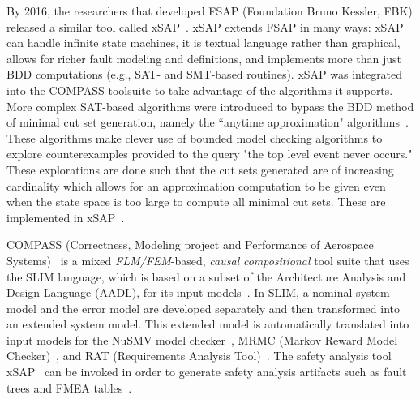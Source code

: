 By 2016, the researchers that developed FSAP (Foundation Bruno Kessler, FBK) released a similar tool called xSAP~\cite{DBLP:conf/tacas/BittnerBCCGGMMZ16}. xSAP extends FSAP in many ways: xSAP can handle infinite state machines, it is textual language rather than graphical, allows for richer fault modeling and definitions, and implements more than just BDD computations (e.g., SAT- and SMT-based routines). xSAP was integrated into the COMPASS toolsuite to take advantage of the algorithms it supports. More complex SAT-based algorithms were introduced to bypass the BDD method of minimal cut set generation, namely the ``anytime approximation" algorithms~\cite{CAV2015:BoCiGrMa, mattarei2016scalable}. These algorithms make clever use of bounded model checking algorithms to explore counterexamples provided to the query "the top level event never occurs." These explorations are done such that the cut sets generated are of increasing cardinality which allows for an approximation computation to be given even when the state space is too large to compute all minimal cut sets. These are implemented in xSAP~\cite{CAV2015:BoCiGrMa}.

COMPASS (Correctness, Modeling project and Performance of Aerospace Systems)~\cite{10.1007/978-3-642-04468-7_15} is a mixed {\em FLM/FEM}-based, {\em causal} {\em compositional} tool suite that uses the SLIM language, which is based on a subset of the Architecture Analysis and Design Language (AADL), for its input models~\cite{5185388, criticalembeddedsystems}. In SLIM, a nominal system model and the error model are developed separately and then transformed into an extended system model.  This extended model is automatically translated into input models for the NuSMV model checker~\cite{Cimatti2000, NuSMV}, MRMC (Markov Reward Model Checker)~\cite{Katoen:2005:MRM:1114692.1115230, MRMC}, and RAT (Requirements Analysis Tool)~\cite{RAT}. The safety analysis tool xSAP~\cite{DBLP:conf/tacas/BittnerBCCGGMMZ16} can be invoked in order to generate safety analysis artifacts such as fault trees and FMEA tables~\cite{compass30toolset}.  %

